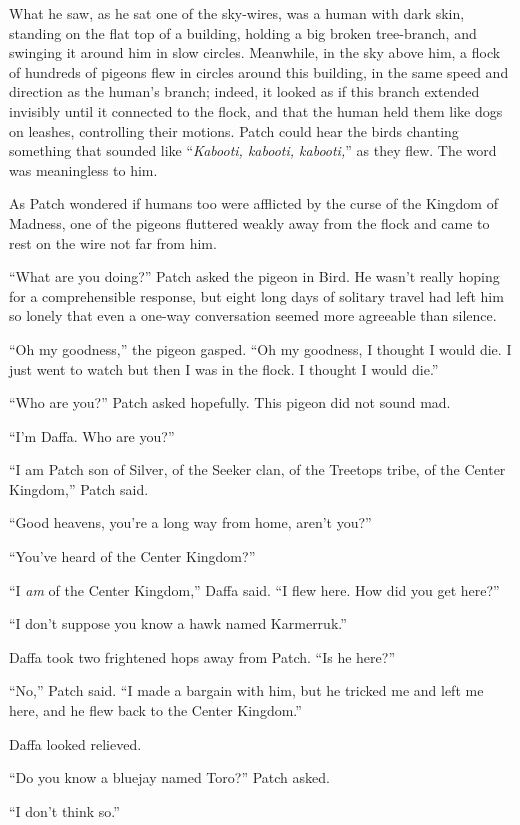 \documentclass[ebook,oneside,openany,12pt]{memoir}
\begin{document}
What he saw, as he sat one of the sky-wires, was a human with dark
skin, standing on the flat top of a building, holding a big broken
tree-branch, and swinging it around him in slow circles. Meanwhile, in
the sky above him, a flock of hundreds of pigeons flew in circles
around this building, in the same speed and direction as the human’s
branch; indeed, it looked as if this branch extended invisibly until
it connected to the flock, and that the human held them like dogs on
leashes, controlling their motions. Patch could hear the birds
chanting something that sounded like “\emph{Kabooti, kabooti,
kabooti,}” as they flew. The word was meaningless to him.

As Patch wondered if humans too were afflicted by the curse of the
Kingdom of Madness, one of the pigeons fluttered weakly away from the
flock and came to rest on the wire not far from him.

“What are you doing?” Patch asked the pigeon in Bird. He wasn’t really
hoping for a comprehensible response, but eight long days of solitary
travel had left him so lonely that even a one-way conversation seemed
more agreeable than silence.

“Oh my goodness,” the pigeon gasped. “Oh my goodness, I thought I
would die. I just went to watch but then I was in the flock. I thought
I would die.”

“Who are you?” Patch asked hopefully. This pigeon did not sound mad.

“I’m Daffa. Who are you?”

“I am Patch son of Silver, of the Seeker clan, of the Treetops tribe,
of the Center Kingdom,” Patch said.

“Good heavens, you’re a long way from home, aren’t you?”

“You’ve heard of the Center Kingdom?”

“I \emph{am} of the Center Kingdom,” Daffa said. “I flew here. How
did you get here?”

“I don’t suppose you know a hawk named Karmerruk.”

Daffa took two frightened hops away from Patch. “Is he here?”

“No,” Patch said. “I made a bargain with him, but he tricked me and
left me here, and he flew back to the Center Kingdom.”

Daffa looked relieved.

“Do you know a bluejay named Toro?” Patch asked.

“I don’t think so.”
\end{document}

